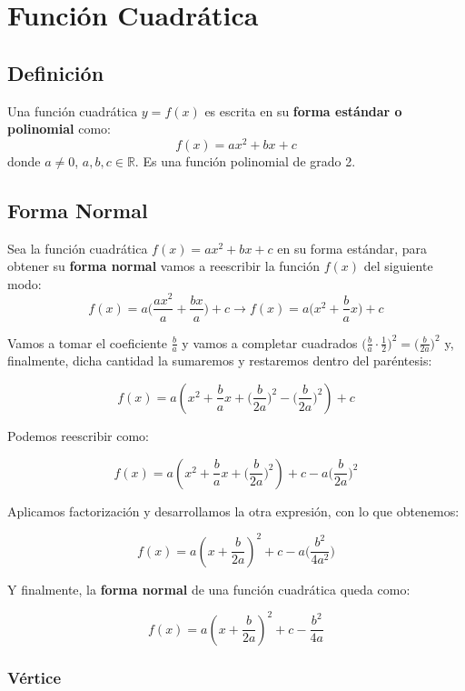 \documentclass[letterpaper, 10pt, oneside]{book}
\begin{document}
	\chapter{Función Cuadrática}
	\section{Definición}
	\begin{tcolorbox}[colback=white]
		Una función cuadrática $y=f(x)$ es escrita en su \textbf{forma estándar o polinomial} como: $$f(x)=ax^2+bx+c$$ donde $a\neq0$, $a,b,c\in\mathbb{R}$. Es una función polinomial de grado 2.
	\end{tcolorbox}
	
	\section{Forma Normal}
	
	Sea la función cuadrática $f(x)=ax^2+bx+c$ en su forma estándar, para obtener su \textbf{forma normal}	vamos a reescribir la función $f(x)$ del siguiente modo:
	$$f(x)=a\bigg(\frac{ax^2}{a}+\frac{bx}{a}\bigg)+c \rightarrow f(x)= a\bigg(x^2+\frac{b}{a}x\bigg)+c$$
	
	Vamos a tomar el coeficiente $\displaystyle{\frac{b}{a}}$ y vamos a completar cuadrados $\displaystyle{\bigg(\frac{b}{a}\cdot\frac{1}{2}\bigg)^2 = \bigg(\frac{b}{2a}\bigg)^2}$ y, finalmente, dicha cantidad la sumaremos y restaremos  dentro del paréntesis:
	
	$$f(x)=a\left(x^2+\frac{b}{a}x+\bigg(\frac{b}{2a}\bigg)^2-\bigg(\frac{b}{2a}\bigg)^2\right)+c$$
	
	Podemos reescribir como:
	
	$$f(x)=a\left(x^2+\frac{b}{a}x+\bigg(\frac{b}{2a}\bigg)^2\right)+c-a\bigg(\frac{b}{2a}\bigg)^2$$
	
	Aplicamos factorización y desarrollamos la otra expresión, con lo que obtenemos: 
	
	$$f(x)=a\left(x+\frac{b}{2a}\right)^2+c-a\bigg(\frac{b^2}{4a^2}\bigg)$$
	
	Y finalmente, la \textbf{forma normal} de una función cuadrática queda como: 
	
	\begin{tcolorbox}[colback=white]
		$$f(x)=a\left(x+\frac{b}{2a}\right)^2+c-\frac{b^2}{4a}$$
	\end{tcolorbox}
	
	\subsection{Vértice}
	
\end{document}
